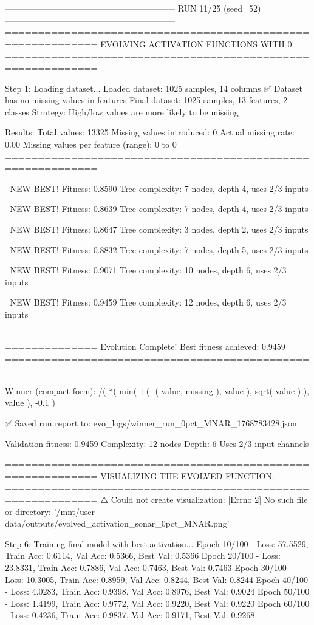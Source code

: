 ------------------------------------------------------------
RUN 11/25 (seed=52)
------------------------------------------------------------
============================================================
EVOLVING ACTIVATION FUNCTIONS
WITH 0%
============================================================

Step 1: Loading dataset...
Loaded dataset: 1025 samples, 14 columns
✅ Dataset has no missing values in features
Final dataset: 1025 samples, 13 features, 2 classes
Strategy: High/low values are more likely to be missing

Results:
  Total values: 13325
  Missing values introduced: 0
  Actual missing rate: 0.00%
  Missing values per feature (range): 0 to 0
============================================================


🎯 NEW BEST! Fitness: 0.8590
Tree complexity: 7 nodes, depth 4, uses 2/3 inputs

🎯 NEW BEST! Fitness: 0.8639
Tree complexity: 7 nodes, depth 4, uses 2/3 inputs

🎯 NEW BEST! Fitness: 0.8647
Tree complexity: 3 nodes, depth 2, uses 2/3 inputs

🎯 NEW BEST! Fitness: 0.8832
Tree complexity: 7 nodes, depth 5, uses 2/3 inputs

🎯 NEW BEST! Fitness: 0.9071
Tree complexity: 10 nodes, depth 6, uses 2/3 inputs

🎯 NEW BEST! Fitness: 0.9459
Tree complexity: 12 nodes, depth 6, uses 2/3 inputs

============================================================
Evolution Complete!
Best fitness achieved: 0.9459
============================================================

Winner (compact form):
 /(
  *(
    min(
      +(
        -(
          value,
          missing
        ),
        value
      ),
      sqrt(
        value
      )
    ),
    value
  ),
  -0.1
)

✅ Saved run report to: evo_logs/winner_run_0pct_MNAR_1768783428.json

Validation fitness: 0.9459
Complexity: 12 nodes
Depth: 6
Uses 2/3 input channels

============================================================
VISUALIZING THE EVOLVED FUNCTION:
============================================================
⚠️ Could not create visualization: [Errno 2] No such file or directory: '/mnt/user-data/outputs/evolved_activation_sonar_0pct_MNAR.png'

Step 6: Training final model with best activation...
Epoch  10/100 - Loss: 57.5529, Train Acc: 0.6114, Val Acc: 0.5366, Best Val: 0.5366
Epoch  20/100 - Loss: 23.8331, Train Acc: 0.7886, Val Acc: 0.7463, Best Val: 0.7463
Epoch  30/100 - Loss: 10.3005, Train Acc: 0.8959, Val Acc: 0.8244, Best Val: 0.8244
Epoch  40/100 - Loss: 4.0283, Train Acc: 0.9398, Val Acc: 0.8976, Best Val: 0.9024
Epoch  50/100 - Loss: 1.4199, Train Acc: 0.9772, Val Acc: 0.9220, Best Val: 0.9220
Epoch  60/100 - Loss: 0.4236, Train Acc: 0.9837, Val Acc: 0.9171, Best Val: 0.9268

